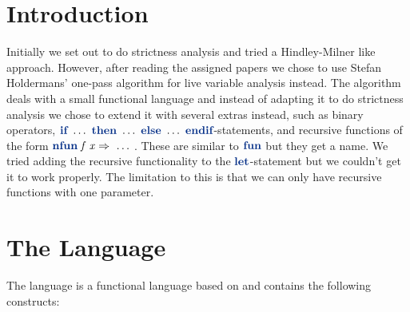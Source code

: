 \documentclass[a4paper,11pt]{article}
\title{\mytitle}
\author{\myauthor}
\newcommand{\hKeyword}[1]{\textbf{\color{steelblue}{#1}}}
\newcommand{\Varid}[1]{\mathit{#1}}
\begin{document}
  
\maketitle

\begin{abstract}
  Dead code elimination is an important part of optimizing a program, as a lot
  of analyses and optimizations can benefit of having a smaller input. We have
  implemented dead code analysis for a simple functional language, and we have
  investigated how it relates to strictness analysis in that language.
\end{abstract}

\section{Introduction}
  Initially we set out to do strictness analysis and tried a Hindley-Milner
  like approach. However, after reading the assigned papers we chose to use
  Stefan Holdermans' one-pass algorithm for live variable analysis instead.
  The algorithm deals with a small functional language and instead of adapting
  it to do strictness analysis we chose to extend it with several extras
  instead, such as binary operators, \ensuremath{\hKeyword{if}\ \dots\ \hKeyword{then}\ \dots\ \hKeyword{else}\ \dots\ \hKeyword{endif}}-statements, and recursive functions of the form \ensuremath{\hKeyword{nfun}\;\Varid{f}\;\Varid{x}\Rightarrow \ \dots\ }.
  These are similar to \ensuremath{\hKeyword{fun}} but they get a name. We tried adding the
  recursive functionality to the \ensuremath{\hKeyword{let}}-statement but we couldn't get it to
  work properly. The limitation to this is that we can only have recursive
  functions with one parameter.

\section{The Language}
The language is a functional language based on
\cite{Holdermans:2010:RMT:1868281.1868283,Holdermans:2010:MSM:1706356.1706379}
and contains the following constructs:
\end{document}
